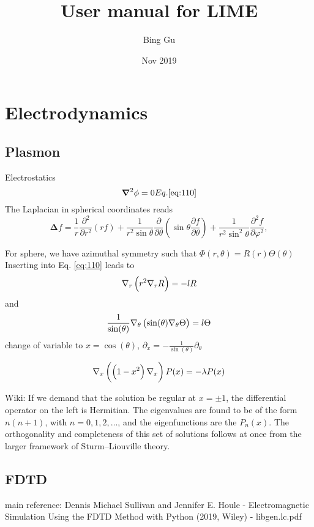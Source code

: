 \documentclass[a4paper,12pt]{book}
\newcommand{\pa}{\partial}
\newcommand{\eq}[1]{Eq. \eqref{#1}}
\newcommand{\grad}{\nabla}
\renewcommand{\pa}{\partial}
\newcommand{\be}{\begin{equation}}
\newcommand{\ee}{\end{equation}}
\begin{document}
\author{Bing Gu}
\title{User manual for LIME}
\date{Nov 2019}

\frontmatter
\maketitle
\tableofcontents

\mainmatter
%
%


\chapter{Electrodynamics}


\section{Plasmon }

Electrostatics
\be
\bm \grad^2 \phi = 0
\eq{eq:110}
\ee
The Laplacian in spherical coordinates reads
\be
\bm \Delta f={\frac {1}{r}}{\frac {\partial ^{2}}{\partial r^{2}}}(rf)+{\frac {1}{r^{2}\sin \theta }}{\frac {\partial }{\partial \theta }}\left(\sin \theta {\frac {\partial f}{\partial \theta }}\right)+{\frac {1}{r^{2}\sin ^{2}\theta }}{\frac {\partial ^{2}f}{\partial \varphi ^{2}}},
\ee

For sphere, we have azimuthal symmetry such that $\Phi(r, \theta) = R(r) \Theta(\theta)$
Inserting into \eq{eq:110} leads to
\be
\grad_r \del{r^2 \grad_r R} = - l R
\ee
and
\be
\frac{1}{\sin(\theta)} \grad_\theta \del{\sin(\theta) \grad_\theta \Theta} = l \Theta
\ee
change of variable to $x = \cos(\theta)$,
$ \pa_x = - \frac{1}{\sin(\theta)} \pa_\theta
$

\be
\grad_x \del{\del{1 - x^2} \grad_x} P(x) = -\lambda P(x)
\ee

Wiki: If we demand that the solution be regular at $x=\pm 1$, the differential operator on the left is Hermitian. The eigenvalues are found to be of the form $n(n + 1)$, with $n=0,1,2,\ldots$, and the eigenfunctions are the $P_n(x)$. The orthogonality and completeness of this set of solutions follows at once from the larger framework of Sturm–Liouville theory.

\section{FDTD}
main reference: Dennis Michael Sullivan and Jennifer E. Houle - Electromagnetic Simulation Using the FDTD Method with Python (2019, Wiley) - libgen.lc.pdf
\end{document}
